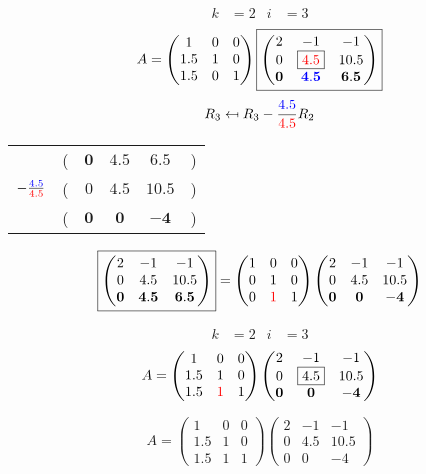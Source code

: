 \documentclass[pdf]{beamer}
\begin{document}
\begin{frame}{}\begin{align*} k &= 2 & i &= 3 \end{align*} $$A=\begin{pmatrix}1&0&0\\1.5&1&0\\1.5&0&1\end{pmatrix} \boxed{\begin{pmatrix}2&-1&-1\\0&\boxed{{\color{red}4.5}}&10.5\\\mathbf{0}&\mathbf{{\color{blue}4.5}}&\mathbf{6.5}\end{pmatrix}} $$ $$R_3 \mapsfrom R_3 - \frac{{\color{blue}4.5}}{{\color{red}4.5}} R_2$$ \begin{center}\begin{tabular}{cccccc}  &(& $ \mathbf{0} $ & $ \mathbf{4.5} $ & $ \mathbf{6.5} $ &)\\$ -\frac{{\color{blue}4.5}}{{\color{red}4.5}} $&(& $ 0 $ & $ 4.5 $ & $ 10.5 $ &)\\\hline  &(& $ \mathbf{0} $ & $ \mathbf{0} $ & $ \mathbf{-4} $ &) \end{tabular}\end{center} $$ \boxed{\begin{pmatrix}2&-1&-1\\0&4.5&10.5\\\mathbf{0}&\mathbf{4.5}&\mathbf{6.5}\end{pmatrix}} = \begin{pmatrix}1&0&0\\0&1&0\\0&{\color{red}1}&1\end{pmatrix} \begin{pmatrix}2&-1&-1\\0&4.5&10.5\\\mathbf{0}&\mathbf{0}&\mathbf{-4}\end{pmatrix} $$\end{frame}
\begin{frame}{}\begin{align*} k &= 2 & i &= 3 \end{align*}$$A=\begin{pmatrix}1&0&0\\1.5&1&0\\1.5&{\color{red}1}&1\end{pmatrix} \begin{pmatrix}2&-1&-1\\0&\boxed{4.5}&10.5\\\mathbf{0}&\mathbf{0}&\mathbf{-4}\end{pmatrix} $$\end{frame}
\begin{frame}{}$$A=\begin{pmatrix}1&0&0\\1.5&1&0\\1.5&1&1\end{pmatrix} \begin{pmatrix}2&-1&-1\\0&4.5&10.5\\0&0&-4\end{pmatrix}$$
\end{frame}
\end{document}
